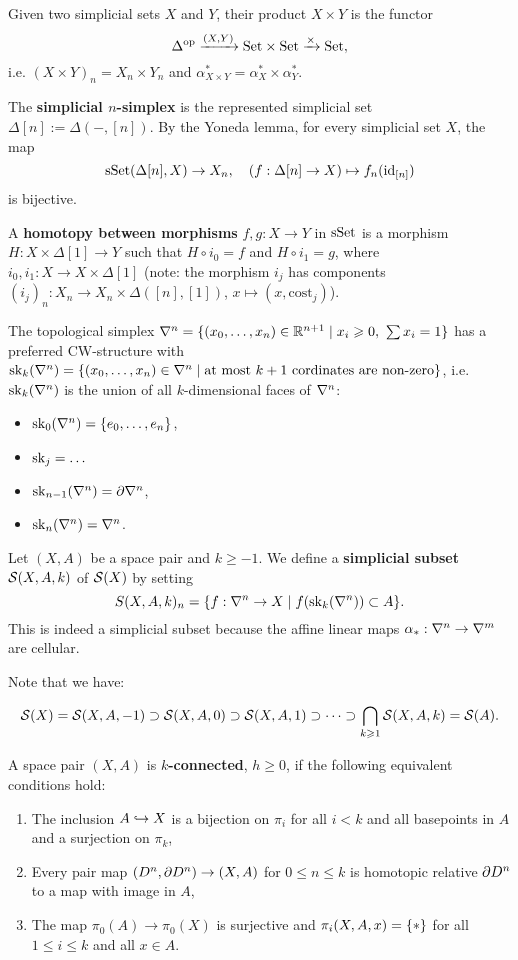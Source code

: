 

Given two simplicial sets $X$ and $Y$, their product $X\times Y$ is the functor \[\Delta^\op\xto{(X,Y)}\Set\times\Set\xto{\times}\Set,\] i.e. $(X\times Y)_n=X_n\times Y_n$ and $\alpha^*_{X\times Y}=\alpha^*_X\times\alpha^*_Y$.

The \textbf{simplicial $n$-simplex} is the represented simplicial set $\Delta[n]:=\Delta(-,[n])$. By the Yoneda lemma, for every simplicial set $X$, the map
\[\sSet(\Delta[n],X)\to X_n,\quad (f:\Delta[n]\to X)\mapsto f_n(\id_{[n]})\]
is bijective.

A \textbf{homotopy between morphisms} $f,g:X\to Y$ in $\sSet$ is a morphism $H:X\times\Delta[1]\to Y$ such that $H\circ i_0=f$ and $H\circ i_1=g$, where $i_0,i_1:X\to X\times\Delta[1]$ (note: the morphism $i_j$ has components $(i_j)_n:X_n\to X_n\times\Delta([n],[1])$, $x\mapsto(x,\text{cost}_j)$).

The topological simplex $\nabla^n=\cb{(\xso)\in\R^{n+1}\mid x_i\geq0,\ \sum x_i=1}$ has a preferred CW-structure with $\sk_k(\nabla^n)=\cb{(\xso)\in\nabla^n\mid\text{at most }k+1\text{ cordinates are non-zero}}$, i.e. $\sk_k(\ns)$ is the union of all $k$-dimensional faces of $\ns$:
\begin{itemize}
    \item $\sk_0(\nabla^n)=\cb{\nno{e}{n}}$,
    \item $\sk_j=\dots$
    \item $\sk_{n-1}(\nabla^n)=\de\nabla^n$,
    \item $\sk_n(\nabla^n)=\nabla^n$.
\end{itemize}\medskip

Let $(X,A)$ be a space pair and $k\geq-1$. We define a \textbf{simplicial subset} $\S(X,A,k)$ of $\S(X)$ by setting
\[S(X,A,k)_n=\cb{f:\ns\to X\mid f(\sk_k(\ns))\subset A}.\]
This is indeed a simplicial subset because the affine linear maps $\alpha_*:\ns\to\ms$ are cellular.

Note that we have:

\[\S(X)=\S(X,A,-1)\supset \S(X,A,0)\supset \S(X,A,1)\supset\dots\supset\bigcap_{k\geq1}\S(X,A,k)=\S(A).\]

A space pair $(X,A)$ is \textbf{$k$-connected}, $h\geq0$, if the following equivalent conditions hold:
\begin{enumerate}[label={(\alph*)},topsep=0.5\thmsep]
    \item The inclusion $A\hto X$ is a bijection on $\pi_i$ for all $i<k$ and all basepoints in $A$ and a surjection on $\pi_k$,
    \item Every pair map $(D^n,\de D^n)\to (X,A)$ for $0\leq n\leq k$ is homotopic relative $\de D^n$ to a map with image in $A$,
    \item The map $\pi_0(A)\to \pi_0(X)$ is surjective and $\pi_i(X,A,x)=\cb{*}$ for all $1\leq i\leq k$ and all $x\in A$.
\end{enumerate}

